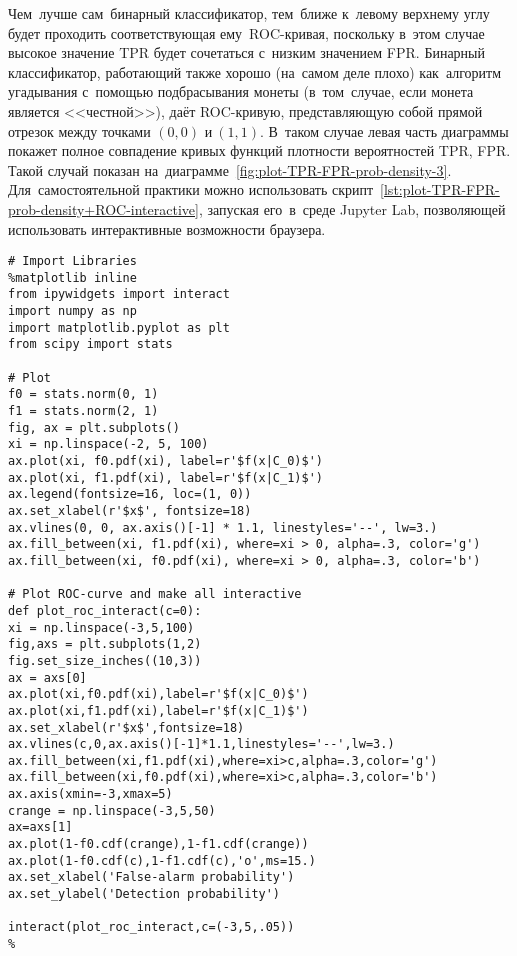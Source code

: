\documentclass[]{scrreprt}
\begin{document}
Чем~лучше сам~бинарный классификатор, тем~ближе к~левому верхнему углу будет проходить соответствующая ему~ROC-кривая, поскольку в~этом случае высокое значение TPR будет сочетаться с~низким значением FPR. Бинарный классификатор, работающий также хорошо (на~самом деле плохо) как~алгоритм угадывания с~помощью подбрасывания монеты (в~том~случае, если монета является <<честной>>), даёт ROC-кривую, представляющую собой прямой отрезок между точками $(0,0)$ и$~(1,1)$. В~таком случае левая часть диаграммы покажет полное совпадение кривых функций плотности вероятностей TPR, FPR. Такой случай показан на~диаграмме~\ref{fig:plot-TPR-FPR-prob-density-3}. Для~самостоятельной практики можно использовать скрипт~\ref{lst:plot-TPR-FPR-prob-density+ROC-interactive}, запуская его~в~среде Jupyter Lab, позволяющей использовать интерактивные возможности браузера.
%
\begin{lstlisting}[float, caption = Построение интерактивной диаграммы плотности распределения TPR и~FPR и~соответствующей ей~ROC кривой для~заданного порогового значения, firstnumber=1, label= lst:plot-TPR-FPR-prob-density+ROC-interactive]
# Import Libraries
%matplotlib inline
from ipywidgets import interact
import numpy as np
import matplotlib.pyplot as plt
from scipy import stats

# Plot
f0 = stats.norm(0, 1)
f1 = stats.norm(2, 1)
fig, ax = plt.subplots()
xi = np.linspace(-2, 5, 100)
ax.plot(xi, f0.pdf(xi), label=r'$f(x|C_0)$')
ax.plot(xi, f1.pdf(xi), label=r'$f(x|C_1)$')
ax.legend(fontsize=16, loc=(1, 0))
ax.set_xlabel(r'$x$', fontsize=18)
ax.vlines(0, 0, ax.axis()[-1] * 1.1, linestyles='--', lw=3.)
ax.fill_between(xi, f1.pdf(xi), where=xi > 0, alpha=.3, color='g')
ax.fill_between(xi, f0.pdf(xi), where=xi > 0, alpha=.3, color='b')

# Plot ROC-curve and make all interactive
def plot_roc_interact(c=0):
xi = np.linspace(-3,5,100)
fig,axs = plt.subplots(1,2)
fig.set_size_inches((10,3))
ax = axs[0]
ax.plot(xi,f0.pdf(xi),label=r'$f(x|C_0)$')
ax.plot(xi,f1.pdf(xi),label=r'$f(x|C_1)$')
ax.set_xlabel(r'$x$',fontsize=18)
ax.vlines(c,0,ax.axis()[-1]*1.1,linestyles='--',lw=3.)
ax.fill_between(xi,f1.pdf(xi),where=xi>c,alpha=.3,color='g')
ax.fill_between(xi,f0.pdf(xi),where=xi>c,alpha=.3,color='b')
ax.axis(xmin=-3,xmax=5)
crange = np.linspace(-3,5,50)
ax=axs[1]
ax.plot(1-f0.cdf(crange),1-f1.cdf(crange))
ax.plot(1-f0.cdf(c),1-f1.cdf(c),'o',ms=15.)
ax.set_xlabel('False-alarm probability')
ax.set_ylabel('Detection probability')

interact(plot_roc_interact,c=(-3,5,.05))
%
\end{lstlisting}
\end{document}
